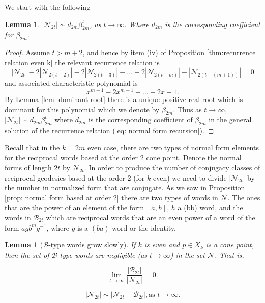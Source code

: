 \documentclass[11pt]{amsart}
\numberwithin{equation}{section}
\theoremstyle{plain}
\newtheorem{lem}[thm]{Lemma}
\begin{document}
  



We start with the following



\begin{lem}\label{lem: recurrence asymptotic}
$|\mathcal{N}_{2t}| \sim d_{2m} \beta_{2m} ^{t}$, as $t \to \infty$. Where $d_{2m}$ is the corresponding   coefficient for $\beta_{2m}$.
\end{lem}


  
\begin{proof} Assume $t >m+2$, and hence by item (iv) of 
  Proposition \ref{thm:recurrence relation even k}
the relevant recurrence relation is 
\begin{equation*}
	|\mathcal{N}_{2t}| - 2|\mathcal{N}_{2(t-2)}| - 2|\mathcal{N}_{2(t-3)}| - \dots - 2|\mathcal{N}_{2(t-m)}| - |\mathcal{N}_{2(t-(m+1))}| = 0
	\end{equation*}
	and associated characteristic polynomial is
	\begin{equation}
	x^{m+1} -2x^{m-1} - \dots -2x-1.
	\end{equation}
By Lemma \ref{lem: dominant root} there is a unique
	   positive real root which is dominant  for this polynomial which we denote by   $\beta_{2m}$.  Thus as $t \to \infty$, 
	   $|\mathcal{N}_{2t}| \sim d_{2m} \beta_{2m} ^{t}$ where $d_{2m}$ is the    corresponding coefficient of $\beta_{2m}$ in the general solution  of the recurrence relation (\ref{eq: normal form recursion}).
  \end{proof}	

Recall that in the $k=2m$ even case,  there are two types of  normal form elements for the reciprocal words based at the order 2 cone point.  Denote the normal forms of length $2t$ by $\mathcal{N}_{2t}$.
In order to produce the number of conjugacy classes  of reciprocal geodesics based at the order 2 (for $k$ even) we need to divide  $|\mathcal{N}_{2t}|$  by  the number in normalized form that are conjugate.   As we saw in 
Proposition  \ref{prop: normal form based at order 2} there are two types of words in $\mathcal{N}$.  The ones that are the power of 
an element of the form $[a,h]$, $h$ a (bb) word, and the words in    
$\mathcal{B}_{2t}$  which are    reciprocal words that are an even power of a word of the form $agb^{m}g^{-1}$,
where $g$ is a $(ba)$ word or the identity.   



\begin{lem}[$\mathcal{B}$-type words grow slowly]
\label{lem:btypesslow}
If $k$ is even and $p \in X_{k}$ is a cone point, then the set of 
$\mathcal{B}$-type words are negligible (as $t \rightarrow \infty$) in the set $\mathcal{N}$. That is,



\[\displaystyle\lim_{t\to\infty}\dfrac{|\mathcal{B}_{2t}|}{|\mathcal{N}_{2t}|}=0.\]

\begin{equation}
\label{eqn:atypesdominate}
|\mathcal{N}_{2t}|\sim |\mathcal{N}_{2t}-\mathcal{B}_{2t}|, \textrm{as}\,\,t\to\infty.\end{equation}

\end{lem}
\end{document}
